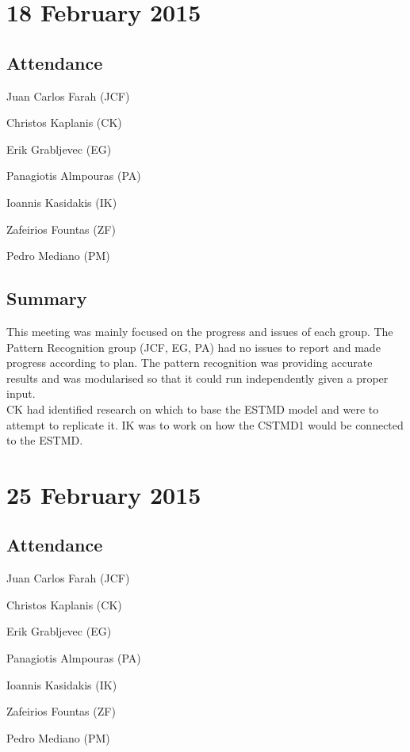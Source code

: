 \documentclass[a4paper,11pt]{article}
\begin{document}
\maketitle
\section*{18 February 2015}
\subsection*{Attendance}
\begin{compactenum}
\item Juan Carlos Farah (JCF)
\item Christos Kaplanis (CK)
\item Erik Grabljevec (EG)
\item Panagiotis Almpouras (PA)
\item Ioannis Kasidakis (IK)
\item Zafeirios Fountas (ZF)
\item Pedro Mediano (PM)
\end{compactenum}

\subsection*{Summary}
This meeting was mainly focused on the progress and issues of each group. The Pattern Recognition group (JCF, EG, PA) had no issues to report and made progress according to plan. The pattern recognition was providing accurate results and was modularised so that it could run independently given a proper input.
\\ CK had identified research on which to base the ESTMD model and were to attempt to replicate it. IK was to work on how the CSTMD1 would be connected to the ESTMD.

\maketitle
\section*{25 February 2015}
\subsection*{Attendance}
\begin{compactenum}
\item Juan Carlos Farah (JCF)
\item Christos Kaplanis (CK)
\item Erik Grabljevec (EG)
\item Panagiotis Almpouras (PA)
\item Ioannis Kasidakis (IK)
\item Zafeirios Fountas (ZF)
\item Pedro Mediano (PM)
\end{compactenum}
\end{document}

